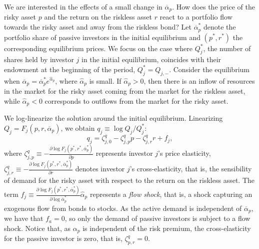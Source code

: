 We are interested in the effects of a small change in $\overline{\alpha}_p$. How does the price of the risky asset $p$ and the return on the riskless asset $r$ react to a portfolio flow towards the risky asset and away from the riskless bond? Let $\overline{\alpha}_p^*$ denote the portfolio share of passive investors in the initial equilibrium and $(p^*, r^*)$ the corresponding equilibrium prices. 
We focus on the case where $Q_j^*$, the number of shares held by investor $j$ in the initial equilibrium, coincides with their endowment at the beginning of the period, $Q_j^* = Q_{j,-}$.
Consider the equilibrium when $\overline{\alpha}_p = \overline{\alpha}_p^* e^{\hat{\alpha}_p}$, where $\hat{\alpha}_p$ is small. 
If $\hat{\alpha}_p > 0$, then there is an inflow of resources in the market for the risky asset coming from the market for the riskless asset, while $\hat{\alpha}_p < 0$ corresponds to outflows from the market for the risky asset.

We log-linearize the solution around the initial equilibrium. 
 Linearizing $Q_j = F_j(p, r, \overline{\alpha}_p)$, we obtain $q_j \equiv \log Q_j / Q_j^*$:
\begin{equation}
    q_{j} = \zeta_{j,0}^q - \zeta_{j,p}^q p - \zeta_{j,r}^q r + f_j,
\end{equation}
where $\zeta_{j,p}^q \equiv - \frac{\partial \log F_j(p^*, r^*, \overline{\alpha}_p^*)}{\partial p}$ represents investor $j$'s price elasticity, $\zeta_{j,r}^q \equiv - \frac{\partial \log F_j(p^*, r^*, \overline{\alpha}_p^*)}{\partial r}$ denotes investor $j$'s cross-elasticity, that is, the  sensibility of demand for the risky asset with respect to the return on the riskless asset.
The term $f_j \equiv \frac{\partial \log F_j(p^*, r^*, \overline{\alpha}_p^*)}{\partial \log \overline{\alpha}_p^*} \hat{\alpha}_p$ represents a \textit{flow shock}, that is, a shock capturing an exogenous flow from bonds to stocks.
As the active demand is independent of $\overline{\alpha}_p$, we have that $f_a = 0$, so only the demand of passive investors is subject to a flow shock.
Notice that, as $\alpha_{p}$ is independent of the risk premium, the cross-elasticity for the passive investor is zero, that is, $\zeta_{p,r}^q = 0$.

